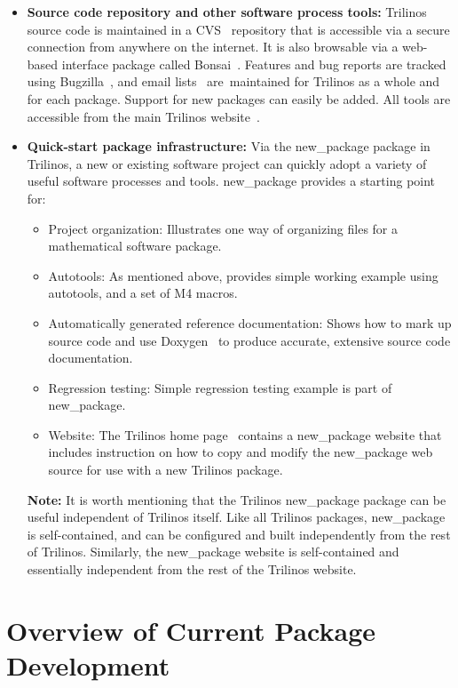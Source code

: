 \documentclass[acmtoms,acmnow]{acmtrans2m}
\begin{document}
\begin{itemize}
\item {\bf Source code repository and other software process tools:}
Trilinos source code is
maintained in a CVS~\cite{CVS} repository that is accessible via a
secure connection from anywhere on the internet.  It is also browsable
via a web-based interface package called Bonsai~\cite{Bonsai}.  Features 
and bug reports are tracked using Bugzilla~\cite{Bugzilla}, and email 
lists~\cite{Mailman} are\
maintained for Trilinos as a whole and for each package.  Support for new
packages can easily be added.  All tools are accessible from the main
Trilinos website~\cite{Trilinos-home-page}.

\item {\bf Quick-start package infrastructure:} Via the new\_package package in
Trilinos, a new or existing software project can quickly adopt a
variety of useful software processes and tools.  new\_package provides a
starting point for:
\begin{itemize}
\item Project organization:  Illustrates one way of
organizing files for a mathematical software package.
\item Autotools: As mentioned above, provides simple working example
using autotools, and a set of M4 macros.
\item Automatically generated reference documentation: Shows how
to mark up source code and use Doxygen~\cite{Doxygen} to produce
accurate, extensive source code documentation.
\item Regression testing: Simple regression testing example is part of
new\_package.
\item Website: The Trilinos home page~\cite{Trilinos-home-page}
contains a new\_package website that includes instruction on how to
copy and modify the new\_package web source for use with a new
Trilinos package.
\end{itemize}

{\bf Note:} It is worth mentioning that the Trilinos new\_package package can be
useful independent of Trilinos itself.  Like all Trilinos packages,
new\_package is self-contained, and can be configured and
built independently from the rest of Trilinos.  Similarly, the
new\_package website is self-contained and essentially independent
from the rest of the Trilinos website.
\end{itemize}


\section{Overview of Current Package Development}
\label{sect:Software}
\end{document}
